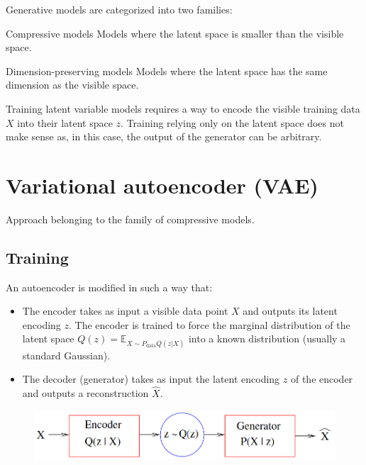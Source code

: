 Generative models are categorized into two families:
\begin{descriptionlist}
    \item[Compressive models] 
        Models where the latent space is smaller than the visible space.

    \item[Dimension-preserving models] 
        Models where the latent space has the same dimension as the visible space.
\end{descriptionlist}

\begin{remark}
    Training latent variable models requires a way to encode the visible training data $X$ into their latent space $z$.
    Training relying only on the latent space does not make sense as, in this case, the output of the generator can be arbitrary.
\end{remark}



\section{Variational autoencoder (VAE)}

Approach belonging to the family of compressive models.


\subsection{Training}

An autoencoder is modified in such a way that:
\begin{itemize}
    \item The encoder takes as input a visible data point $X$ and outputs its latent encoding $z$.
        The encoder is trained to force the marginal distribution of the latent space $Q(z) = \mathbb{E}_{X \sim P_\text{data} Q(z|X)}$ 
        into a known distribution (usually a standard Gaussian).

    \item The decoder (generator) takes as input the latent encoding $z$ of the encoder and outputs a reconstruction $\hat{X}$.
\end{itemize}

\begin{figure}[H]
    \centering
    \includegraphics[width=0.5\linewidth]{./img/vae.png}
\end{figure}

